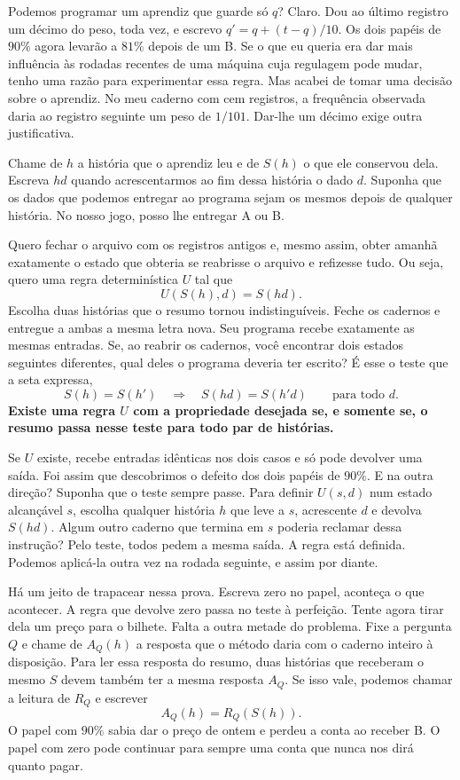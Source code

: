 Podemos programar um aprendiz que guarde só $q$? Claro. Dou ao último registro um décimo do peso, toda vez, e escrevo $q'=q+(t-q)/10$. Os dois papéis de $90\%$ agora levarão a $81\%$ depois de um B. Se o que eu queria era dar mais influência às rodadas recentes de uma máquina cuja regulagem pode mudar, tenho uma razão para experimentar essa regra. Mas acabei de tomar uma decisão sobre o aprendiz. No meu caderno com cem registros, a frequência observada daria ao registro seguinte um peso de $1/101$. Dar-lhe um décimo exige outra justificativa.

Chame de $h$ a história que o aprendiz leu e de $S(h)$ o que ele conservou dela. Escreva $hd$ quando acrescentarmos ao fim dessa história o dado $d$. Suponha que os dados que podemos entregar ao programa sejam os mesmos depois de qualquer história. No nosso jogo, posso lhe entregar A ou B.

Quero fechar o arquivo com os registros antigos e, mesmo assim, obter amanhã exatamente o estado que obteria se reabrisse o arquivo e refizesse tudo. Ou seja, quero uma regra determinística $U$ tal que
\[
                        U(S(h),d)=S(hd).
\]
Escolha duas histórias que o resumo tornou indistinguíveis. Feche os cadernos e entregue a ambas a mesma letra nova. Seu programa recebe exatamente as mesmas entradas. Se, ao reabrir os cadernos, você encontrar dois estados seguintes diferentes, qual deles o programa deveria ter escrito? É esse o teste que a seta expressa,
\[
              S(h)=S(h')\quad\Longrightarrow\quad S(hd)=S(h'd)
              \qquad\text{para todo }d .
\]
\textbf{Existe uma regra $U$ com a propriedade desejada se, e somente se, o resumo passa nesse teste para todo par de histórias.}

Se $U$ existe, recebe entradas idênticas nos dois casos e só pode devolver uma saída. Foi assim que descobrimos o defeito dos dois papéis de $90\%$. E na outra direção? Suponha que o teste sempre passe. Para definir $U(s,d)$ num estado alcançável $s$, escolha qualquer história $h$ que leve a $s$, acrescente $d$ e devolva $S(hd)$. Algum outro caderno que termina em $s$ poderia reclamar dessa instrução? Pelo teste, todos pedem a mesma saída. A regra está definida. Podemos aplicá-la outra vez na rodada seguinte, e assim por diante.

Há um jeito de trapacear nessa prova. Escreva zero no papel, aconteça o que acontecer. A regra que devolve zero passa no teste à perfeição. Tente agora tirar dela um preço para o bilhete. Falta a outra metade do problema. Fixe a pergunta $Q$ e chame de $A_Q(h)$ a resposta que o método daria com o caderno inteiro à disposição. Para ler essa resposta do resumo, duas histórias que receberam o mesmo $S$ devem também ter a mesma resposta $A_Q$. Se isso vale, podemos chamar a leitura de $R_Q$ e escrever
\[
                         A_Q(h)=R_Q(S(h)).
\]
O papel com $90\%$ sabia dar o preço de ontem e perdeu a conta ao receber B. O papel com zero pode continuar para sempre uma conta que nunca nos dirá quanto pagar.

